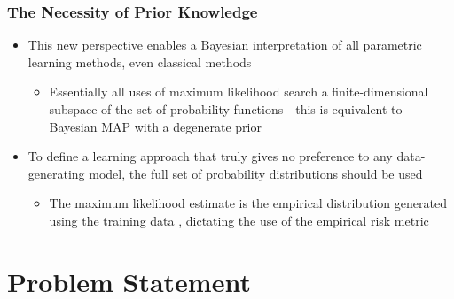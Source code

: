 \documentclass[aspectratio=169,usenames,dvipsnames]{beamer}
\begin{document}
\begin{frame}
\frametitle{The Necessity of Prior Knowledge}

\begin{itemize}
\item This new perspective enables a Bayesian interpretation of all parametric learning methods, even classical methods
\vspace{0.25em}
	\begin{itemize}
	\item Essentially all uses of maximum likelihood search a finite-dimensional subspace of the set of probability functions \cite{papoulis} - this is equivalent to Bayesian MAP with a \alert{degenerate prior}
	\end{itemize}
\vspace{0.5em}
\item To define a learning approach that truly gives no preference to any data-generating model, the \underline{full} set of probability distributions should be used
\vspace{0.25em}
	\begin{itemize}
	\item The maximum likelihood estimate is the \alert{empirical distribution} generated using the training data \cite{rao}, dictating the use of the empirical risk metric
	\end{itemize}

\end{itemize}

\vspace{1em}
\centering
{}

\end{frame}







\section{Problem Statement}
\end{document}
